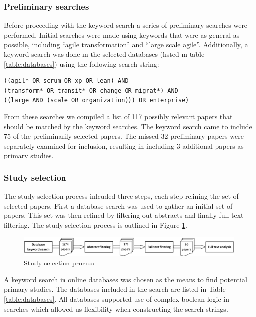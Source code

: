 \documentclass[preprint,authoryear,12pt]{elsarticle}
\begin{document}
\subsubsection{Preliminary searches}

Before proceeding with the keyword search a series of preliminary searches were
performed. Initial searches were made using keywords that were as general as
possible, including ``agile transformation'' and ``large scale agile''.
Additionally, a keyword search was done in the selected databases (listed in
table \ref{table:databases}) using the following search string:

\begin{verbatim}
((agil* OR scrum OR xp OR lean) AND
(transform* OR transit* OR change OR migrat*) AND
((large AND (scale OR organization))) OR enterprise)
\end{verbatim}

From these searches we compiled a list of 117 possibly relevant papers that
should be matched by the keyword searches. The keyword search came to include 75
of the preliminarily selected papers. The missed 32 preliminary papers were
separately examined for inclusion, resulting in including 3 additional papers as
primary studies.

\subsubsection{Study selection}

The study selection process inlcuded three steps, each step refining the set of
selected papers. First a database search was used to gather an initial set of
papers. This set was then refined by filtering out abstracts and finally full
text filtering. The study selection process is outlined in Figure
\ref{fig:selectionprocess}.

\begin{figure}[b]
  \begin{center}
    \includegraphics[width=1\textwidth]{graphics/research_process.pdf}
    \caption{Study selection process}
    \label{fig:selectionprocess}
  \end{center}
\end{figure}

A keyword search in online databases was chosen as the means to find potential
primary studies. The databases included in the search are listed in Table
\ref{table:databases}. All databases supported use of complex boolean logic in
searches which allowed us flexibility when constructing the search strings.
\end{document}
